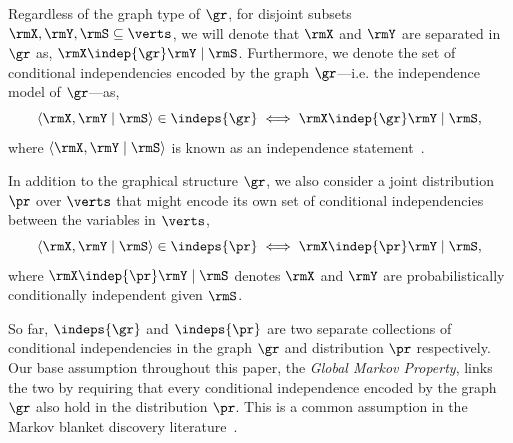 \documentclass[accepted]{uai2026} %
\theoremstyle{plain}
\theoremstyle{definition}
\theoremstyle{remark}
\newcommand{\todo}[1]{\colorbox{yellow}{#1}}
\begin{document}



Regardless of the graph type of $\gr$, for disjoint subsets
$\rmX,\rmY,\rmS\subseteq\verts$, we will denote that $\rmX$ and $\rmY$
are separated in $\gr$ as, $\rmX \indep{\gr} \rmY \mid \rmS$.
Furthermore, we denote the set of conditional independencies encoded by
the graph $\gr$---i.e. the independence model of $\gr$---as,
\begin{equation}
  \label{eq:g-indeps}
  \braket{\rmX,\rmY\mid\rmS} \in \indeps{\gr}
  \iff \rmX \indep{\gr} \rmY \mid \rmS,
\end{equation}
where $\braket{\rmX,\rmY\mid\rmS}$ is known as an independence
statement~\citep{sadeghi2017}.

In addition to the graphical structure $\gr$, we also consider a joint
distribution $\pr$ over $\verts$ that might encode its own set of
conditional independencies between the variables in $\verts$,
\begin{equation}
  \label{eq:4}
  \braket{\rmX,\rmY\mid\rmS} \in \indeps{\pr}
  \iff \rmX \indep{\pr} \rmY \mid \rmS,
\end{equation}
where $\rmX \indep{\pr} \rmY \mid \rmS$ denotes $\rmX$ and
$\rmY$ are probabilistically conditionally independent given $\rmS$.

So far, $\indeps{\gr}$ and $\indeps{\pr}$ are two separate collections
of conditional independencies in the graph $\gr$ and distribution $\pr$
respectively. Our base assumption throughout this paper, the
\emph{Global Markov Property}, links the two by requiring that every
conditional independence encoded by the graph $\gr$ also hold in the
distribution $\pr$. This is a common assumption in the Markov blanket
discovery literature~\cite{schluter2014,yu2020a,marx2021}.
\end{document}
